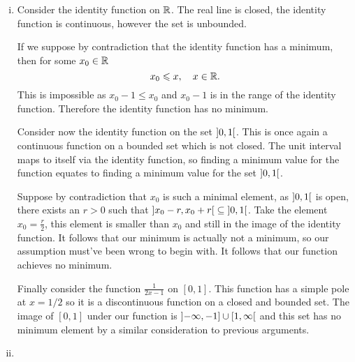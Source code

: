\documentclass[12pt]{memoir}
\begin{document}
\begin{ptcbr}
\begin{enumerate}[i)]
    \itemsep=-0.4em
    \item Consider the identity function on $\mathbb{R}$. The real line is closed, the identity function is continuous, however the set is unbounded.\par 
    If we suppose by contradiction that the identity function has a minimum, then for some $x_0\in\mathbb{R}$ 
    $$x_0\leqslant x,\quad x\in\mathbb{R}.$$
    This is impossible as $x_0-1\leq x_0$ and $x_0-1$ is in the range of the identity function. Therefore the identity function has no minimum.\par
    Consider now the identity function on the set $\left\rbrack0,1\right\lbrack$. This is once again a continuous function on a bounded set which is not closed. The unit interval maps to itself via the identity function, so finding a minimum value for the function equates to finding a minimum value for the set $\left\rbrack0,1\right\lbrack$.\par 
    Suppose by contradiction that $x_0$ is such a minimal element, as $\left\rbrack0,1\right\lbrack$ is open, there exists an $r>0$ such that $\left\rbrack x_0-r,x_0+r\right\lbrack\subseteq\left\rbrack0,1\right\lbrack$. Take the element $x_0=\frac{r}{2}$, this element is smaller than $x_0$ and still in the image of the identity function. It follows that our minimum is actually not a minimum, so our assumption must've been wrong to begin with. It follows that our function achieves no minimum.\par
    Finally consider the function $\frac{1}{2x-1}$ on $[0,1]$. This function has a simple pole at $x=1/2$ so it is a discontinuous function on a closed and bounded set. The image of $[0,1]$ under our function is $\left\rbrack-\infty,-1\right\rbrack\cup\left\lbrack1,\infty\right\lbrack$ and this set has no minimum element by a similar consideration to previous arguments.
    \item 
\end{enumerate}
\end{ptcbr}
\end{document}

